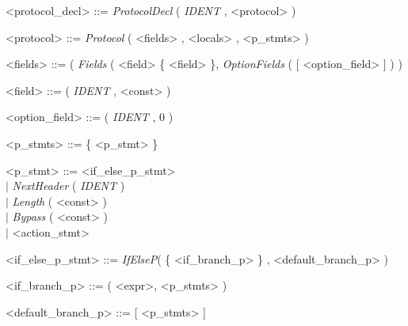 \documentclass{article}
\begin{document}
\begin{grammar} \small

{\renewcommand\baselinestretch{0}\selectfont
<protocol\_decl>   ::= \textit{ProtocolDecl} ( \emph{IDENT} , <protocol> )

<protocol>   ::= \textit{Protocol} ( <fields> , <locals> , <p\_stmts> )

<fields>   ::= ( \textit{Fields} ( <field> \{ <field> \}, \textit{OptionFields} ( [ <option\_field> ] ) )

<field>     ::=   ( \textit{IDENT} , <const> )

<option\_field>     ::=   ( \textit{IDENT} , 0 )


<p\_stmts>     ::=   \{ <p\_stmt>  \}

<p\_stmt>     ::=   <if\_else\_p\_stmt> \\
     \hspace*{0.95cm} $\mid$  \textit{NextHeader} ( \emph{IDENT} ) \\
     \hspace*{0.95cm} $\mid$  \textit{Length} ( <const> ) \\
     \hspace*{0.95cm} $\mid$  \textit{Bypass} ( <const> ) \\
     \hspace*{0.95cm} $\mid$  <action\_stmt>

<if\_else\_p\_stmt>     ::=   \textit{IfElseP}( \{ <if\_branch\_p> \} , <default\_branch\_p> )

<if\_branch\_p>     ::=   ( <expr>, <p\_stmts> )

<default\_branch\_p>     ::= [ <p\_stmts> ]

\par}

\end{grammar}
\end{document}
